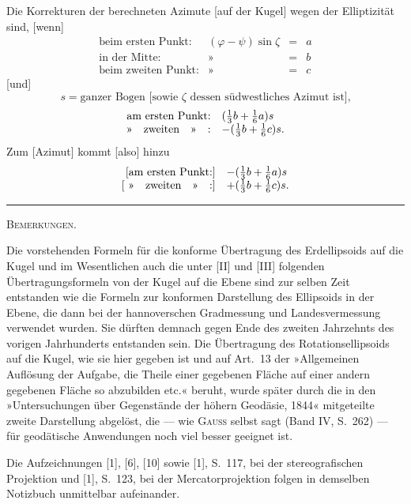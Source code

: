 Die Korrekturen der berechneten Azimute [auf der Kugel] wegen der Elliptizität sind, [wenn]
\[
\begin{array}{rccl}
\text{beim ersten Punkt:}&(\varphi-\psi)\sin\zeta&=&a\\
\text{in der Mitte:}&\text{»}&=&b\\
\text{beim zweiten Punkt:}&\text{»}&=&c
\end{array}
\]
[und]
\[
s=\text{ganzer Bogen [sowie $\zeta$ dessen südwestliches Azimut ist],}
\]
\[
\begin{array}{rl}
\text{am ersten Punkt:}&(\tfrac13b+\tfrac16a)s\\
\text{»\quad zweiten\quad »\quad :}&-(\tfrac13b+\tfrac16c)s.
\end{array}
\]
Zum  [Azimut] kommt [also] hinzu
\[
\begin{array}{rl}
\text{[am ersten Punkt:]}&-(\tfrac13b+\tfrac16a)s\\
\text{[ »\quad zweiten\quad »\quad :]}&+(\tfrac13b+\tfrac16c)s.
\end{array}
\]
\begin{center}\rule{.18\textwidth}{.4pt}\par\vspace{12mm}\textsc{Bemerkungen.}\end{center}
\begingroup\small
Die vorstehenden Formeln für die konforme Übertragung des Erdellipsoids auf die Kugel und im Wesentlichen auch die unter [II] und [III] folgenden Übertragungsformeln von der Kugel auf die Ebene sind zur selben Zeit entstanden wie die Formeln zur konformen Darstellung des Ellipsoids in der Ebene, die dann bei der hannoverschen Gradmessung und Landesvermessung verwendet wurden. Sie dürften demnach gegen Ende des zweiten Jahrzehnts des vorigen Jahrhunderts entstanden sein. Die Übertragung des Rotationsellipsoids auf die Kugel, wie sie hier gegeben ist und auf Art.~13 der »Allgemeinen Auflösung der Aufgabe, die Theile einer gegebenen Fläche auf einer andern gegebenen Fläche so abzubilden etc.« beruht, wurde später durch die in den »Untersuchungen über Gegenstände der höhern Geodäsie, 1844« mitgeteilte zweite Darstellung abgelöst, die --- wie \textsc{Gauss} selbst sagt (Band IV, S.~262) --- für geodätische Anwendungen noch viel besser geeignet ist.

Die Aufzeichnungen [1], [6], [10] sowie [1], S.~117, bei der stereografischen Projektion und [1], S.~123, bei der Mercatorprojektion folgen in demselben Notizbuch unmittelbar aufeinander.

